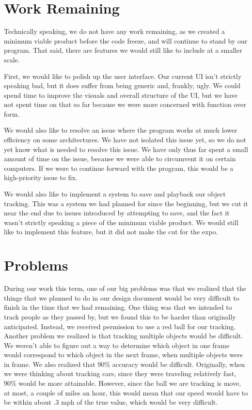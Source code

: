 \documentclass[onecolumn, draftclsnofoot,10pt, compsoc]{IEEEtran}
\begin{document}
\section{Work Remaining}
Technically speaking, we do not have any work remaining, as we created a minimum viable product before the code freeze, and will continue to stand by our program.  That said, there are features we would still like to include at a smaller scale.

First, we would like to polish up the user interface.  Our current UI isn't strictly speaking bad, but it does suffer from being generic and, frankly, ugly.  We could spend time to improve the visuals and overall structure of the UI, but we have not spent time on that so far because we were more concerned with function over form.

We would also like to resolve an issue where the program works at much lower efficiency on some architectures.  We have not isolated this issue yet, so we do not yet know what is needed to resolve this issue.  We have only thus far spent a small amount of time on the issue, because we were able to circumvent it on certain computers.  If we were to continue forward with the program, this would be a high-priority issue to fix.

We would also like to implement a system to save and playback our object tracking.  This was a system we had planned for since the beginning, but we cut it near the end due to issues introduced by attempting to save, and the fact it wasn't strictly speaking a piece of the minimum viable product.  We would still like to implement this feature, but it did not make the cut for the expo.

\section{Problems}
During our work this term, one of our big problems was that we realized that the things that we planned to do in our design document would be very difficult to finish in the time that we had remaining.
One thing was that we intended to track people as they passed by, but we found this to be harder than originally anticipated.
Instead, we received permission to use a red ball for our tracking.
Another problem we realized is that tracking multiple objects would be difficult.
We weren't able to figure out a way to determine which object in one frame would correspond to which object in the next frame, when multiple objects were in frame.
We also realized that 90\% accuracy would be difficult.
Originally, when we were thinking about tracking cars, since they were traveling relatively fast, 90\% would be more attainable.
However, since the ball we are tracking is move, at most, a couple of miles an hour, this would mean that our speed would have to be within about .3 mph of the true value, which would be very difficult.
\end{document}
